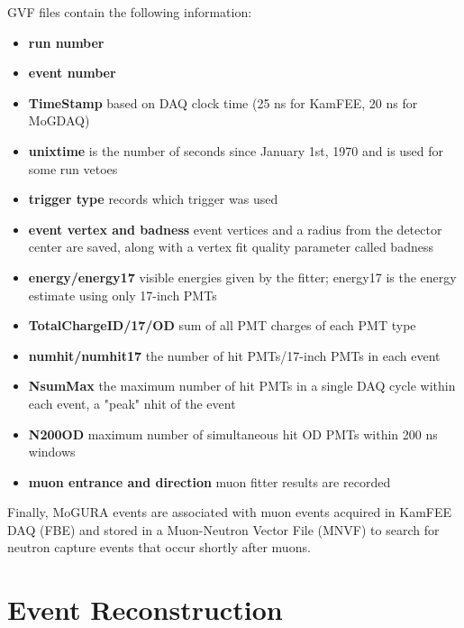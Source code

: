 GVF files contain the following information:
\begin{itemize}
	\item \textbf{run number}
	\item \textbf{event number}
	\item \textbf{TimeStamp} based on DAQ clock time (25 ns for KamFEE, 20 ns for MoGDAQ)
	\item \textbf{unixtime} is the number of seconds since January 1st, 1970 and is used for some run vetoes
	\item \textbf{trigger type} records which trigger was used
	\item \textbf{event vertex and badness} event vertices and a radius from the detector center are saved, along with a vertex fit quality parameter called badness 
	\item \textbf{energy/energy17} visible energies given by the fitter; energy17 is the energy estimate using only 17-inch PMTs
	\item \textbf{TotalChargeID/17/OD} sum of all PMT charges of each PMT type
	\item \textbf{numhit/numhit17} the number of hit PMTs/17-inch PMTs in each event
	\item \textbf{NsumMax} the maximum number of hit PMTs in a single DAQ cycle within each event, a "peak" nhit of the event
	\item \textbf{N200OD} maximum number of simultaneous hit OD PMTs within 200 ns windows
	\item \textbf{muon entrance and direction} muon fitter results are recorded
\end{itemize}

Finally, MoGURA events are associated with muon events acquired in KamFEE DAQ (FBE) and stored in a Muon-Neutron Vector File (MNVF) to search for neutron capture events that occur shortly after muons.

\section{Event Reconstruction}
